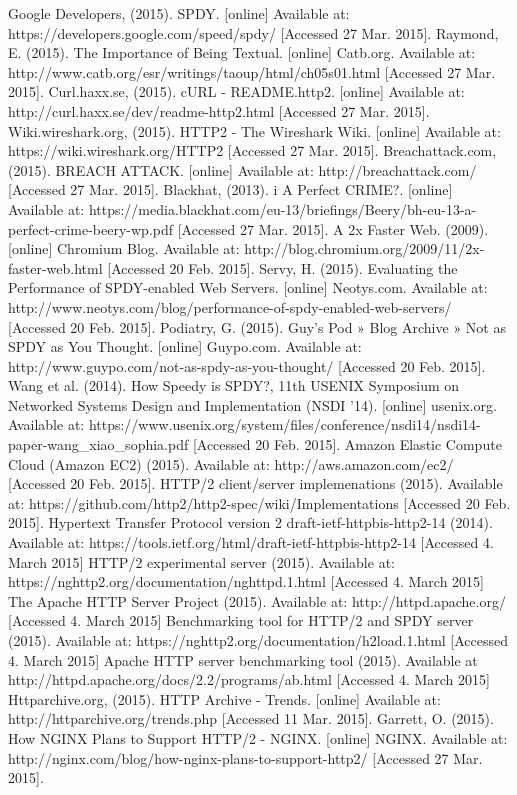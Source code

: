\documentclass{article}
\begin{document}
\begin{thebibliography}
Google Developers, (2015). SPDY. [online] Available at: https://developers.google.com/speed/spdy/ [Accessed 27 Mar. 2015].
Raymond, E. (2015). The Importance of Being Textual. [online] Catb.org. Available at: http://www.catb.org/esr/writings/taoup/html/ch05s01.html [Accessed 27 Mar. 2015].
Curl.haxx.se, (2015). cURL - README.http2. [online] Available at: http://curl.haxx.se/dev/readme-http2.html [Accessed 27 Mar. 2015].
Wiki.wireshark.org, (2015). HTTP2 - The Wireshark Wiki. [online] Available at: https://wiki.wireshark.org/HTTP2 [Accessed 27 Mar. 2015].
Breachattack.com, (2015). BREACH ATTACK. [online] Available at: http://breachattack.com/ [Accessed 27 Mar. 2015].
Blackhat, (2013). i A Perfect CRIME?. [online] Available at: https://media.blackhat.com/eu-13/briefings/Beery/bh-eu-13-a-perfect-crime-beery-wp.pdf [Accessed 27 Mar. 2015].
A 2x Faster Web. (2009). [online] Chromium Blog. Available at: http://blog.chromium.org/2009/11/2x-faster-web.html [Accessed 20 Feb. 2015].
Servy, H. (2015). Evaluating the Performance of SPDY-enabled Web Servers. [online] Neotys.com. Available at: http://www.neotys.com/blog/performance-of-spdy-enabled-web-servers/ [Accessed 20 Feb. 2015].
Podiatry, G. (2015). Guy's Pod » Blog Archive » Not as SPDY as You Thought. [online] Guypo.com. Available at: http://www.guypo.com/not-as-spdy-as-you-thought/ [Accessed 20 Feb. 2015].
Wang et al. (2014). How Speedy is SPDY?, 11th USENIX Symposium on Networked Systems Design and Implementation (NSDI ’14). [online] usenix.org. Available at:
https://www.usenix.org/system/files/conference/nsdi14/nsdi14-paper-wang\_xiao\_sophia.pdf [Accessed 20 Feb. 2015].
 Amazon Elastic Compute Cloud (Amazon EC2) (2015). Available at: http://aws.amazon.com/ec2/ [Accessed 20 Feb. 2015].
  HTTP/2 client/server implemenations (2015). Available at: https://github.com/http2/http2-spec/wiki/Implementations [Accessed 20 Feb. 2015].
 Hypertext Transfer Protocol version 2 draft-ietf-httpbis-http2-14 (2014). Available at: https://tools.ietf.org/html/draft-ietf-httpbis-http2-14 [Accessed 4. March 2015]
 HTTP/2 experimental server (2015). Available at: https://nghttp2.org/documentation/nghttpd.1.html [Accessed 4. March 2015]
 The Apache HTTP Server Project (2015). Available at: http://httpd.apache.org/ [Accessed 4. March 2015]
 Benchmarking tool for HTTP/2 and SPDY server (2015). Available at: https://nghttp2.org/documentation/h2load.1.html [Accessed 4. March 2015]
 Apache HTTP server benchmarking tool (2015). Available at http://httpd.apache.org/docs/2.2/programs/ab.html [Accessed 4. March 2015]
 Httparchive.org, (2015). HTTP Archive - Trends. [online] Available at: http://httparchive.org/trends.php [Accessed 11 Mar. 2015].
Garrett, O. (2015). How NGINX Plans to Support HTTP/2 - NGINX. [online] NGINX. Available at: http://nginx.com/blog/how-nginx-plans-to-support-http2/ [Accessed 27 Mar. 2015].

\end{thebibliography}
\end{document}
